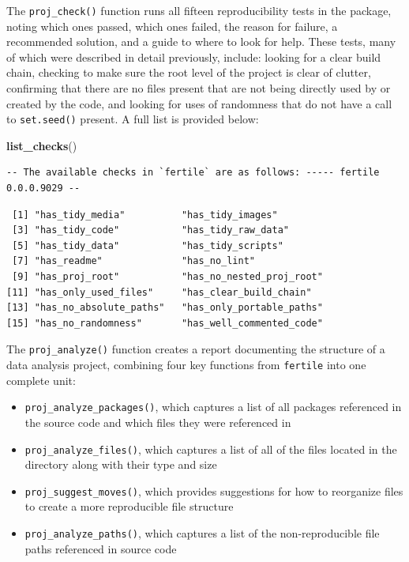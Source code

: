 \documentclass[12pt,twoside]{reedthesis}
\newenvironment{Shaded}{\begin{snugshade}}{\end{snugshade}}
\newcommand{\KeywordTok}[1]{\textcolor[rgb]{0.13,0.29,0.53}{\textbf{#1}}}
\newcommand{\NormalTok}[1]{#1}
\providecommand{\tightlist}{%
  \setlength{\itemsep}{0pt}\setlength{\parskip}{0pt}}
\begin{document}
The \texttt{proj\_check()} function runs all fifteen reproducibility
tests in the package, noting which ones passed, which ones failed, the
reason for failure, a recommended solution, and a guide to where to look
for help. These tests, many of which were described in detail
previously, include: looking for a clear build chain, checking to make
sure the root level of the project is clear of clutter, confirming that
there are no files present that are not being directly used by or
created by the code, and looking for uses of randomness that do not have
a call to \texttt{set.seed()} present. A full list is provided below:
\begin{Shaded}
\begin{Highlighting}[]
\KeywordTok{list_checks}\NormalTok{()}
\end{Highlighting}
\end{Shaded}
\begin{verbatim}
-- The available checks in `fertile` are as follows: ----- fertile 0.0.0.9029 --
\end{verbatim}
\begin{verbatim}
 [1] "has_tidy_media"          "has_tidy_images"        
 [3] "has_tidy_code"           "has_tidy_raw_data"      
 [5] "has_tidy_data"           "has_tidy_scripts"       
 [7] "has_readme"              "has_no_lint"            
 [9] "has_proj_root"           "has_no_nested_proj_root"
[11] "has_only_used_files"     "has_clear_build_chain"  
[13] "has_no_absolute_paths"   "has_only_portable_paths"
[15] "has_no_randomness"       "has_well_commented_code"
\end{verbatim}
The \texttt{proj\_analyze()} function creates a report documenting the
structure of a data analysis project, combining four key functions from
\texttt{fertile} into one complete unit:
\begin{itemize}
\tightlist
\item
  \texttt{proj\_analyze\_packages()}, which captures a list of all
  packages referenced in the source code and which files they were
  referenced in
\item
  \texttt{proj\_analyze\_files()}, which captures a list of all of the
  files located in the directory along with their type and size
\item
  \texttt{proj\_suggest\_moves()}, which provides suggestions for how to
  reorganize files to create a more reproducible file structure
\item
  \texttt{proj\_analyze\_paths()}, which captures a list of the
  non-reproducible file paths referenced in source code
\end{itemize}
\end{document}

